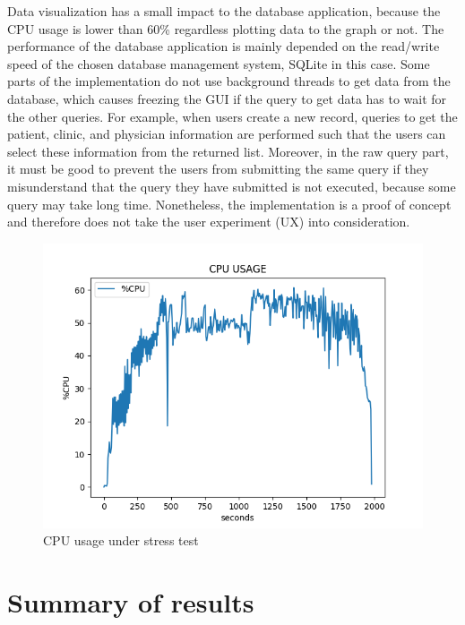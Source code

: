 Data visualization has a small impact to the database application, because the CPU usage is lower than 60\% regardless plotting data to the graph or not. The performance of the database application is mainly depended on the read/write speed of the chosen database management system, SQLite in this case. Some parts of the implementation do not use background threads to get data from the database, which causes freezing the GUI if the query to get data has to wait for the other queries. For example, when users create a new record, queries to get the patient, clinic, and physician information are performed such that the users can select these information from the returned list. Moreover, in the raw query part, it must be good to prevent the users from submitting the same query if they misunderstand that the query they have submitted is not executed, because some query may take long time. Nonetheless, the implementation is a proof of concept and therefore does not take the user experiment (UX) into consideration.
\begin{figure}
    \centering
    \includegraphics[width=1.0\textwidth]{Figures/StressTest.png}
    \caption{CPU usage under stress test}
    \label{fig:Figures/STRESSTEST}
\end{figure}
\section{Summary of results}